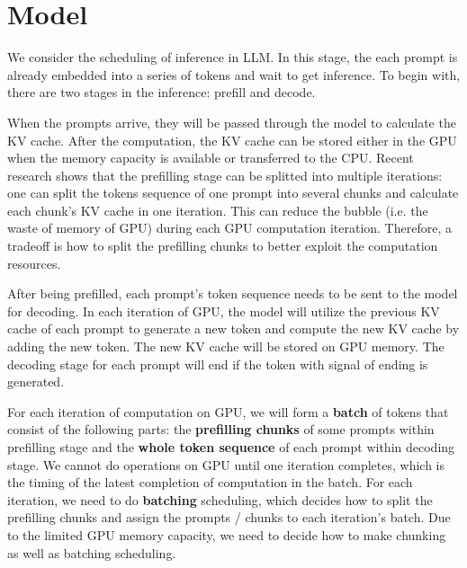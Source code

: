 \documentclass[opre, nonblindrev]{informs3} %
\begin{document}

\maketitle

\section{Model}
We consider the scheduling of inference in LLM. In this stage, the each prompt is already embedded into a series of tokens and wait to get inference. To begin with, there are two stages in the inference: prefill and decode. 

When the prompts arrive, they will be passed through the model to calculate the KV cache. After the computation, the KV cache can be stored either in the GPU when the memory capacity is available or transferred to the CPU. Recent research shows that the prefilling stage can be splitted into multiple iterations: one can split the tokens sequence of one prompt into several chunks and calculate each chunk's KV cache in one iteration. This can reduce the bubble (i.e. the waste of memory of GPU) during each GPU computation iteration. Therefore, a tradeoff is how to split the prefilling chunks to better exploit the computation resources.

After being prefilled, each prompt's token sequence needs to be sent to the model for decoding. In each iteration of GPU, the model will utilize the previous KV cache of each prompt to generate a new token and compute the new KV cache by adding the new token. The new KV cache will be stored on GPU memory. The decoding stage for each prompt will end if the token with signal of ending is generated. 

For each iteration of computation on GPU, we will form a \textbf{batch} of tokens that consist of the following parts: the \textbf{prefilling chunks} of some prompts within prefilling stage and the \textbf{whole token sequence} of each prompt within decoding stage. We cannot do operations on GPU until one iteration completes, which is the timing of the latest completion of computation in the batch. For each iteration, we need to do \textbf{batching} scheduling, which decides how to split the prefilling chunks and assign the prompts / chunks to each iteration's batch. Due to the limited GPU memory capacity, we need to decide how to make chunking as well as batching scheduling.
\end{document}
